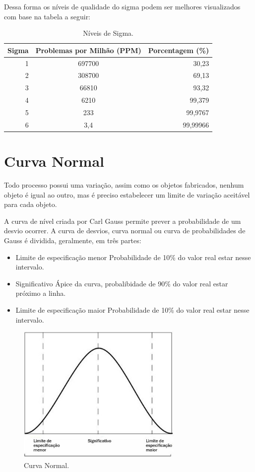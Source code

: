 \documentclass{abnt}
\begin{document}
			Dessa forma os níveis de qualidade do sigma podem ser melhores visualizados com base na tabela a seguir:
			\begin{table}[h]
				\centering

				\begin{tabular}{rcr}
					\toprule
					Sigma & Problemas por Milhão (PPM) & Porcentagem (\%) \\
					\midrule
					 1 & 697700	& 30,23 	\\
					 2 & 308700 & 69,13 	\\
					 3 & 66810 	& 93,32 	\\
					 4 & 6210 	& 99,379 	\\
					 5 & 233 	& 99,9767 	\\
					 6 & 3,4 	& 99,99966 	\\
					\bottomrule		
				\end{tabular}
	
				\label{tab_niveisSigma}
				\caption{Níveis de Sigma.}
				
			\end{table}

		\section {Curva Normal} 
			Todo processo possui uma variação, assim como os objetos fabricados, nenhum objeto é igual ao outro, mas é preciso estabelecer um limite de variação aceitável para cada objeto.
			
			A curva de nível criada por Carl Gauss permite prever a probabilidade de um desvio ocorrer. A curva de desvios, curva normal ou curva de probabilidades de Gauss é dividida, geralmente, em três partes:
			\begin{itemize}
				\item {Limite de especificação menor}
					\subitem Probabilidade de 10\% do valor real estar nesse intervalo. 
				\item {Significativo}
					\subitem Ápice da curva, probalibidade de 90\% do valor real estar próximo a linha. 
				\item {Limite de especificação maior}
					\subitem Probabilidade de 10\% do valor real estar nesse intervalo.
			\end{itemize}
			\begin{figure}[h]
				\centering
				\includegraphics[width=8cm, keepaspectratio]{img/curva.jpg}
				\caption{Curva Normal.}
			\end{figure}
	    
\end{document}
